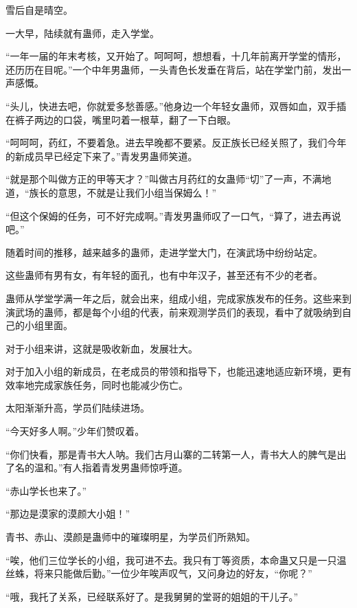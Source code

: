 
\begin{this_body}

雪后自是晴空。

一大早，陆续就有蛊师，走入学堂。

“一年一届的年末考核，又开始了。呵呵呵，想想看，十几年前离开学堂的情形，还历历在目呢。”一个中年男蛊师，一头青色长发垂在背后，站在学堂门前，发出一声感慨。

“头儿，快进去吧，你就爱多愁善感。”他身边一个年轻女蛊师，双唇如血，双手插在裤子两边的口袋，嘴里叼着一根草，翻了一下白眼。

“呵呵呵，药红，不要着急。进去早晚都不要紧。反正族长已经关照了，我们今年的新成员早已经定下来了。”青发男蛊师笑道。

“就是那个叫做方正的甲等天才？”叫做古月药红的女蛊师“切”了一声，不满地道，“族长的意思，不就是让我们小组当保姆么！”

“但这个保姆的任务，可不好完成啊。”青发男蛊师叹了一口气，“算了，进去再说吧。”

随着时间的推移，越来越多的蛊师，走进学堂大门，在演武场中纷纷站定。

这些蛊师有男有女，有年轻的面孔，也有中年汉子，甚至还有不少的老者。

蛊师从学堂学满一年之后，就会出来，组成小组，完成家族发布的任务。这些来到演武场的蛊师，都是每个小组的代表，前来观测学员们的表现，看中了就吸纳到自己的小组里面。

对于小组来讲，这就是吸收新血，发展壮大。

对于加入小组的新成员，在老成员的带领和指导下，也能迅速地适应新环境，更有效率地完成家族任务，同时也能减少伤亡。

太阳渐渐升高，学员们陆续进场。

“今天好多人啊。”少年们赞叹着。

“你们快看，那是青书大人呐。我们古月山寨的二转第一人，青书大人的脾气是出了名的温和。”有人指着青发男蛊师惊呼道。

“赤山学长也来了。”

“那边是漠家的漠颜大小姐！”

青书、赤山、漠颜是蛊师中的璀璨明星，为学员们所熟知。

“唉，他们三位学长的小组，我可进不去。我只有丁等资质，本命蛊又只是一只温丝蛛，将来只能做后勤。”一位少年唉声叹气，又问身边的好友，“你呢？”

“哦，我托了关系，已经联系好了。是我舅舅的堂哥的姐姐的干儿子。”


\end{this_body}
